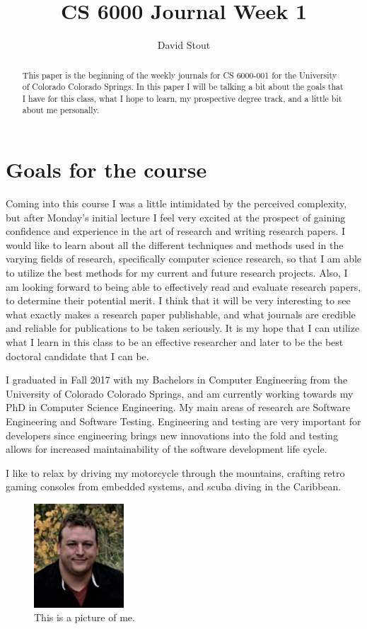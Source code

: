 \documentclass[a4paper]{article}
\title{CS 6000 Journal Week 1}
\author{David Stout}
\begin{document}
\maketitle

\begin{abstract}
This paper is the beginning of the weekly journals for CS 6000-001 for the University of Colorado Colorado 
Springs. In this paper I will be talking a bit about the goals that I have for this class, what I hope to 
learn, my prospective degree track, and a little bit about me personally. 
\end{abstract}

\section{Goals for the course}

Coming into this course I was a little intimidated by the perceived complexity, but after Monday’s initial
lecture I feel very excited at the prospect of gaining confidence and experience in the art of research and 
writing research papers. I would like to learn about all the different techniques and methods used in the
varying fields of research, specifically computer science research, so that I am able to utilize the best
methods for my current and future research projects. Also, I am looking forward to being able to
effectively read and evaluate research papers, to determine their potential merit. I think that it will be 
very interesting to see what exactly makes a research paper publishable, and what journals are credible and 
reliable for publications to be taken seriously. It is my hope that I can utilize what I learn in this
class to be an effective researcher and later to be the best doctoral candidate that I can be.

I graduated in Fall 2017 with my Bachelors in Computer Engineering from the University of Colorado Colorado
Springs, and am currently working towards my PhD in Computer Science Engineering. My main areas of research are 
Software Engineering and Software Testing. Engineering and testing are very important for developers since 
engineering brings new innovations into the fold and testing allows for increased maintainability of the 
software development life cycle.

I like to relax by driving my motorcycle through the mountains, crafting retro gaming consoles from embedded 
systems, and scuba diving in the Caribbean.

\begin{figure}
\centering
\includegraphics[width=0.3\textwidth]{profile2.jpg}
\caption{\label{fig:Me}This is a picture of me.}
\end{figure}
\end{document}
